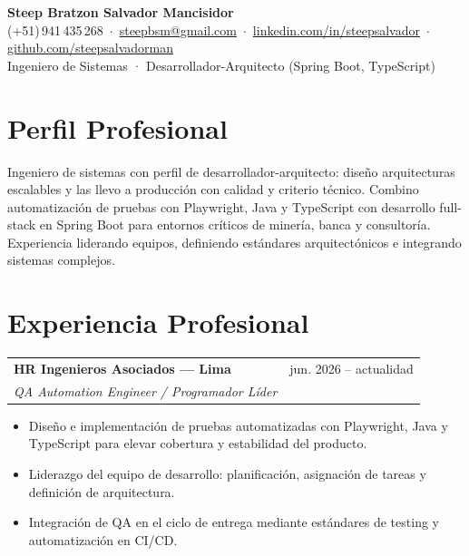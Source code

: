 \documentclass[10pt, a4paper]{article}
\makeatletter
\newcommand{\cventry}[4]{%
    \begin{tabularx}{\linewidth}{@{}Xr@{}}
        \textbf{\small #1} & {\footnotesize\textcolor{subtle}{#2}} \\[-1pt]
        {\footnotesize\textit{\textcolor{subtle}{#3}}} & \\
    \end{tabularx}
    \vspace{0pt}
    #4
    \vspace{1pt}
}
\makeatother
\begin{document}
\pagestyle{empty}

\begin{center}
    {\large\bfseries\color{accent} Steep Bratzon Salvador Mancisidor}\\[2pt]
    {\footnotesize
        (+51)\,941\,435\,268
        \,\textcolor{subtle}{$\cdot$}\,
        \href{mailto:steepbsm@gmail.com}{steepbsm@gmail.com}
        \,\textcolor{subtle}{$\cdot$}\,
        \href{https://linkedin.com/in/steepsalvador}{linkedin.com/in/steepsalvador}
        \,\textcolor{subtle}{$\cdot$}\,
        \href{https://github.com/steepsalvadorman}{github.com/steepsalvadorman}
    }\\[1pt]
    {\footnotesize\textcolor{subtle}{Ingeniero de Sistemas · Desarrollador-Arquitecto (Spring Boot, TypeScript)}}
\end{center}

\vspace{1pt}

\section{Perfil Profesional}
{\small
Ingeniero de sistemas con perfil de desarrollador-arquitecto: diseño arquitecturas escalables y las llevo a producción con calidad y criterio técnico.
Combino automatización de pruebas con Playwright, Java y TypeScript con desarrollo full-stack en Spring Boot para entornos críticos de minería, banca y consultoría.
Experiencia liderando equipos, definiendo estándares arquitectónicos e integrando sistemas complejos.
}

\section{Experiencia Profesional}

\cventry{HR Ingenieros Asociados --- Lima}{jun. 2026 -- actualidad}{QA Automation Engineer / Programador Líder}{
    \begin{itemize}[leftmargin=1.1em, itemsep=0pt, topsep=0pt, parsep=0pt]
        \item[\textbullet] {\small Diseño e implementación de pruebas automatizadas con Playwright, Java y TypeScript para elevar cobertura y estabilidad del producto.}
        \item[\textbullet] {\small Liderazgo del equipo de desarrollo: planificación, asignación de tareas y definición de arquitectura.}
        \item[\textbullet] {\small Integración de QA en el ciclo de entrega mediante estándares de testing y automatización en CI/CD.}
    \end{itemize}
}
\end{document}

